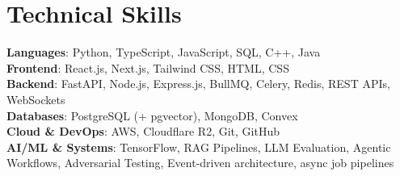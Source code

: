 \documentclass[a4paper,11pt]{article}
\begin{document}
\section{\textbf{Technical Skills}}
 \begin{itemize}[leftmargin=0.05in, label={}]
    \small{\item{
     \textbf{Languages}{: Python, TypeScript, JavaScript, SQL, C++, Java} \\
     \textbf{Frontend}{: React.js, Next.js, Tailwind CSS, HTML, CSS} \\
     \textbf{Backend}{: FastAPI, Node.js, Express.js, BullMQ, Celery, Redis, REST APIs, WebSockets} \\
     \textbf{Databases}{: PostgreSQL (+ pgvector), MongoDB, Convex} \\
     \textbf{Cloud \& DevOps}{: AWS, Cloudflare R2, Git, GitHub} \\
     \textbf{AI/ML \& Systems}{: TensorFlow, RAG Pipelines, LLM Evaluation, Agentic Workflows, Adversarial Testing, Event-driven architecture, async job pipelines}
    }}
 \end{itemize}
\vspace{-8pt}
\end{document}
